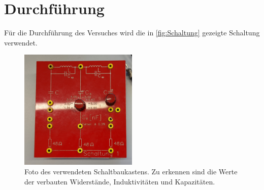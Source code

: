 \section{Durchführung}
\label{sec:Durchführung}
Für die Durchführung des Versuches wird die in \autoref{fig:Schaltung} gezeigte Schaltung verwendet. 
\begin{figure}
    \centering
    \includegraphics[width=0.5\textwidth]{content/Schaltung.jpg}
    \caption{Foto des verwendeten Schaltbaukastens. Zu erkennen sind die Werte der verbauten Widerstände, Induktivitäten und Kapazitäten.}
    \label{fig:Schaltung}
\end{figure}

